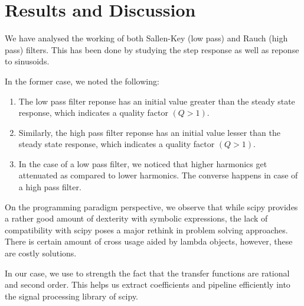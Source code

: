 \documentclass[11pt]{article}
\begin{document}
    \hypertarget{results-and-discussion}{%
\section{Results and Discussion}\label{results-and-discussion}}

We have analysed the working of both Sallen-Key (low pass) and Rauch
(high pass) filters. This has been done by studying the step response as
well as reponse to sinusoids.

In the former case, we noted the following:

\begin{enumerate}
\def\labelenumi{\arabic{enumi}.}
\item
  The low pass filter reponse has an initial value greater than the
  steady state response, which indicates a quality factor \((Q>1)\).
\item
  Similarly, the high pass filter reponse has an initial value lesser
  than the steady state response, which indicates a quality factor
  \((Q>1)\).
\item
  In the case of a low pass filter, we noticed that higher harmonics get
  attenuated as compared to lower harmonics. The converse happens in
  case of a high pass filter.
\end{enumerate}

On the programming paradigm perspective, we observe that while scipy
provides a rather good amount of dexterity with symbolic expressions,
the lack of compatibility with scipy poses a major rethink in problem
solving approaches. There is certain amount of cross usage aided by
lambda objects, however, these are costly solutions.

In our case, we use to strength the fact that the transfer functions are
rational and second order. This helps us extract coefficients and
pipeline efficiently into the signal processing library of scipy.


    
    
    
    
\end{document}
